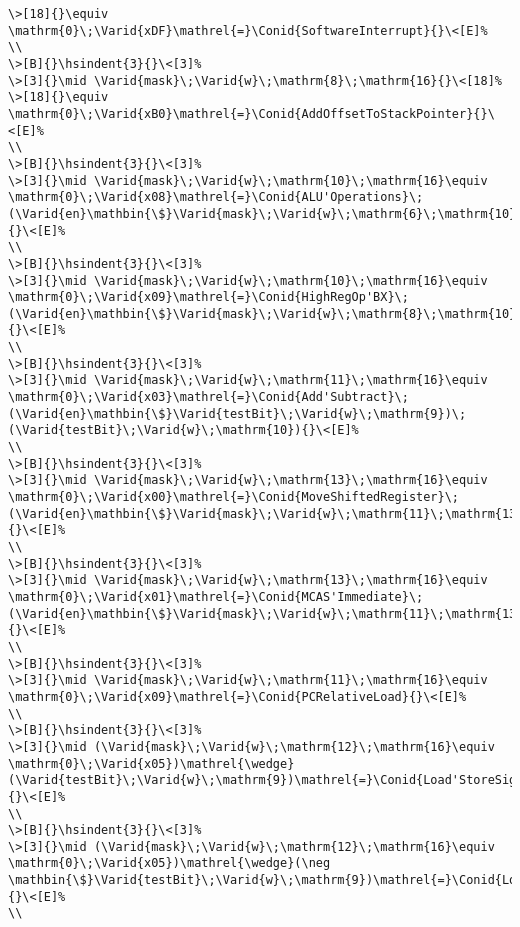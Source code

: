 \documentclass{article}
\newcommand{\Conid}[1]{\mathit{#1}}
\newcommand{\Varid}[1]{\mathit{#1}}
\newcommand{\hsindent}[1]{\quad}%
\begin{document}
\begin{Verbatim}[fontsize=\scriptsize]
\>[18]{}\equiv \mathrm{0}\;\Varid{xDF}\mathrel{=}\Conid{SoftwareInterrupt}{}\<[E]%
\\
\>[B]{}\hsindent{3}{}\<[3]%
\>[3]{}\mid \Varid{mask}\;\Varid{w}\;\mathrm{8}\;\mathrm{16}{}\<[18]%
\>[18]{}\equiv \mathrm{0}\;\Varid{xB0}\mathrel{=}\Conid{AddOffsetToStackPointer}{}\<[E]%
\\
\>[B]{}\hsindent{3}{}\<[3]%
\>[3]{}\mid \Varid{mask}\;\Varid{w}\;\mathrm{10}\;\mathrm{16}\equiv \mathrm{0}\;\Varid{x08}\mathrel{=}\Conid{ALU'Operations}\;(\Varid{en}\mathbin{\$}\Varid{mask}\;\Varid{w}\;\mathrm{6}\;\mathrm{10}){}\<[E]%
\\
\>[B]{}\hsindent{3}{}\<[3]%
\>[3]{}\mid \Varid{mask}\;\Varid{w}\;\mathrm{10}\;\mathrm{16}\equiv \mathrm{0}\;\Varid{x09}\mathrel{=}\Conid{HighRegOp'BX}\;(\Varid{en}\mathbin{\$}\Varid{mask}\;\Varid{w}\;\mathrm{8}\;\mathrm{10}){}\<[E]%
\\
\>[B]{}\hsindent{3}{}\<[3]%
\>[3]{}\mid \Varid{mask}\;\Varid{w}\;\mathrm{11}\;\mathrm{16}\equiv \mathrm{0}\;\Varid{x03}\mathrel{=}\Conid{Add'Subtract}\;(\Varid{en}\mathbin{\$}\Varid{testBit}\;\Varid{w}\;\mathrm{9})\;(\Varid{testBit}\;\Varid{w}\;\mathrm{10}){}\<[E]%
\\
\>[B]{}\hsindent{3}{}\<[3]%
\>[3]{}\mid \Varid{mask}\;\Varid{w}\;\mathrm{13}\;\mathrm{16}\equiv \mathrm{0}\;\Varid{x00}\mathrel{=}\Conid{MoveShiftedRegister}\;(\Varid{en}\mathbin{\$}\Varid{mask}\;\Varid{w}\;\mathrm{11}\;\mathrm{13}){}\<[E]%
\\
\>[B]{}\hsindent{3}{}\<[3]%
\>[3]{}\mid \Varid{mask}\;\Varid{w}\;\mathrm{13}\;\mathrm{16}\equiv \mathrm{0}\;\Varid{x01}\mathrel{=}\Conid{MCAS'Immediate}\;(\Varid{en}\mathbin{\$}\Varid{mask}\;\Varid{w}\;\mathrm{11}\;\mathrm{13})\mathbin{\$}\Varid{en}\mathbin{\$}\Varid{mask}\;\Varid{w}\;\mathrm{0}\;\mathrm{8}{}\<[E]%
\\
\>[B]{}\hsindent{3}{}\<[3]%
\>[3]{}\mid \Varid{mask}\;\Varid{w}\;\mathrm{11}\;\mathrm{16}\equiv \mathrm{0}\;\Varid{x09}\mathrel{=}\Conid{PCRelativeLoad}{}\<[E]%
\\
\>[B]{}\hsindent{3}{}\<[3]%
\>[3]{}\mid (\Varid{mask}\;\Varid{w}\;\mathrm{12}\;\mathrm{16}\equiv \mathrm{0}\;\Varid{x05})\mathrel{\wedge}(\Varid{testBit}\;\Varid{w}\;\mathrm{9})\mathrel{=}\Conid{Load'StoreSignExtendedByte'Halfword}{}\<[E]%
\\
\>[B]{}\hsindent{3}{}\<[3]%
\>[3]{}\mid (\Varid{mask}\;\Varid{w}\;\mathrm{12}\;\mathrm{16}\equiv \mathrm{0}\;\Varid{x05})\mathrel{\wedge}(\neg \mathbin{\$}\Varid{testBit}\;\Varid{w}\;\mathrm{9})\mathrel{=}\Conid{Load'StoreRegisterOffset}{}\<[E]%
\\

\end{Verbatim}
\end{document}
